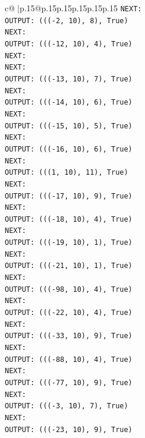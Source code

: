 \documentclass{article}
\begin{document}
{\begin{supertabular}{c@{$\;$}|p{.15\linewidth}@{}p{.15\linewidth}p{.15\linewidth}p{.15\linewidth}p{.15\linewidth}p{.15\linewidth}}
{{{\texttt{NEXT:} \\
\texttt{OUTPUT: ((({-}2, 10), 8), True)} \\
\texttt{NEXT:} \\
\texttt{OUTPUT: ((({-}12, 10), 4), True)} \\
\texttt{NEXT:} \\
\texttt{NEXT:} \\
\texttt{OUTPUT: ((({-}13, 10), 7), True)} \\
\texttt{NEXT:} \\
\texttt{OUTPUT: ((({-}14, 10), 6), True)} \\
\texttt{NEXT:} \\
\texttt{OUTPUT: ((({-}15, 10), 5), True)} \\
\texttt{NEXT:} \\
\texttt{OUTPUT: ((({-}16, 10), 6), True)} \\
\texttt{NEXT:} \\
\texttt{OUTPUT: (((1, 10), 11), True)} \\
\texttt{NEXT:} \\
\texttt{OUTPUT: ((({-}17, 10), 9), True)} \\
\texttt{NEXT:} \\
\texttt{OUTPUT: ((({-}18, 10), 4), True)} \\
\texttt{NEXT:} \\
\texttt{OUTPUT: ((({-}19, 10), 1), True)} \\
\texttt{NEXT:} \\
\texttt{OUTPUT: ((({-}21, 10), 1), True)} \\
\texttt{NEXT:} \\
\texttt{OUTPUT: ((({-}98, 10), 4), True)} \\
\texttt{NEXT:} \\
\texttt{OUTPUT: ((({-}22, 10), 4), True)} \\
\texttt{NEXT:} \\
\texttt{OUTPUT: ((({-}33, 10), 9), True)} \\
\texttt{NEXT:} \\
\texttt{OUTPUT: ((({-}88, 10), 4), True)} \\
\texttt{NEXT:} \\
\texttt{OUTPUT: ((({-}77, 10), 9), True)} \\
\texttt{NEXT:} \\
\texttt{OUTPUT: ((({-}3, 10), 7), True)} \\
\texttt{NEXT:} \\
\texttt{OUTPUT: ((({-}23, 10), 9), True)} \\
}}}
\end{supertabular}}
\end{document}
